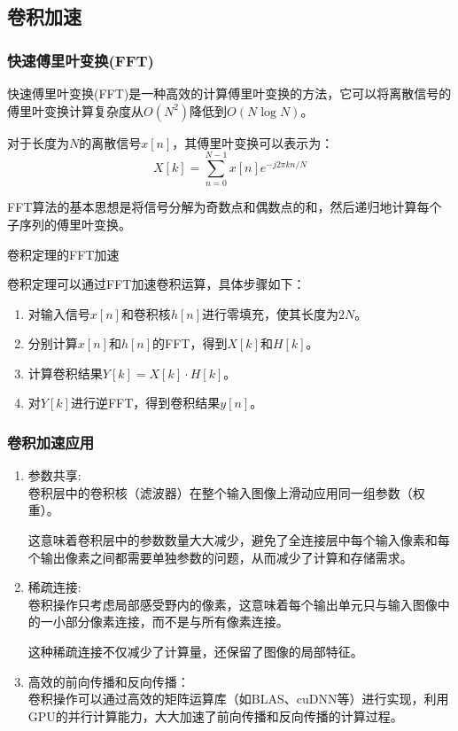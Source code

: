 \documentclass{lzureport}
\begin{document}
\subsection{卷积加速}
\subsubsection{快速傅里叶变换(FFT)}
快速傅里叶变换(FFT)是一种高效的计算傅里叶变换的方法，它可以将离散信号的傅里叶变换计算复杂度从$O(N^2)$降低到$O(N\log N)$。

对于长度为$N$的离散信号$x[n]$，其傅里叶变换可以表示为：
$$X[k]=\sum_{n=0}^{N-1}x[n]e^{-j2\pi kn/N}$$

FFT算法的基本思想是将信号分解为奇数点和偶数点的和，然后递归地计算每个子序列的傅里叶变换。

卷积定理的FFT加速

卷积定理可以通过FFT加速卷积运算，具体步骤如下：
\begin{enumerate}[label=\arabic*)]
	\item 对输入信号$x[n]$和卷积核$h[n]$进行零填充，使其长度为$2N$。
	\item 分别计算$x[n]$和$h[n]$的FFT，得到$X[k]$和$H[k]$。
	\item 计算卷积结果$Y[k]=X[k]\cdot H[k]$。
	\item 对$Y[k]$进行逆FFT，得到卷积结果$y[n]$。
\end{enumerate}

\subsubsection{卷积加速应用}
\begin{enumerate}[label=\arabic*)]
	\item 参数共享:\\
	卷积层中的卷积核（滤波器）在整个输入图像上滑动应用同一组参数（权重）。
	
	这意味着卷积层中的参数数量大大减少，避免了全连接层中每个输入像素和每个输出像素之间都需要单独参数的问题，从而减少了计算和存储需求。
	\item 稀疏连接:\\
	卷积操作只考虑局部感受野内的像素，这意味着每个输出单元只与输入图像中的一小部分像素连接，而不是与所有像素连接。
	
	这种稀疏连接不仅减少了计算量，还保留了图像的局部特征。
	\item 高效的前向传播和反向传播：\\
	卷积操作可以通过高效的矩阵运算库（如BLAS、cuDNN等）进行实现，利用GPU的并行计算能力，大大加速了前向传播和反向传播的计算过程。
\end{enumerate}
\end{document}
